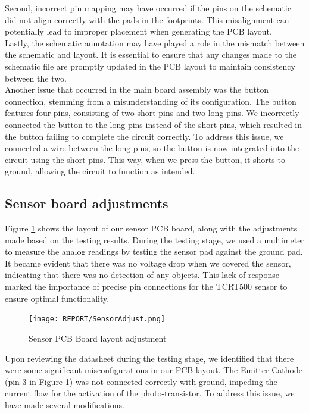 \documentclass{article}
\begin{document}
Second, incorrect pin mapping may have occurred if the pins on the schematic did not align correctly with the pads in the footprints. This misalignment can potentially lead to improper placement when generating the PCB layout.  
\\

Lastly, the schematic annotation may have played a role in the mismatch between the schematic and layout. It is essential to ensure that any changes made to the schematic file are promptly updated in the PCB layout to maintain consistency between the two. 
\\

Another issue that occurred in the main board assembly was the button connection, stemming from a misunderstanding of its configuration. The button features four pins, consisting of two short pins and two long pins. We incorrectly connected the button to the long pins instead of the short pins, which resulted in the button failing to complete the circuit correctly. To address this issue, we connected a wire between the long pins, so the button is now integrated into the circuit using the short pins. This way, when we press the button, it shorts to ground, allowing the circuit to function as intended. 

\subsection{Sensor board adjustments}
Figure \ref{fig:SensorAdjust} shows the layout of our sensor PCB board, along with the adjustments made based on the testing results. During the testing stage, we used a multimeter to measure the analog readings by testing the sensor pad against the ground pad. It became evident that there was no voltage drop when we covered the sensor, indicating that there was no detection of any objects. This lack of response marked the importance of precise pin connections for the TCRT500 sensor to ensure optimal functionality. 

\begin{figure}[H]
    \centering
    \texttt{[image: REPORT/SensorAdjust.png]}
    \caption{Sensor PCB Board layout adjustment}
    \label{fig:SensorAdjust}
\end{figure}

Upon reviewing the datasheet during the testing stage, we identified that there were some significant misconfigurations in our PCB layout. The Emitter-Cathode (pin 3 in Figure \ref{fig:SensorAdjust}) was not connected correctly with ground, impeding the current flow for the activation of the photo-transistor. To address this issue, we have made several modifications.  
\\
\end{document}
